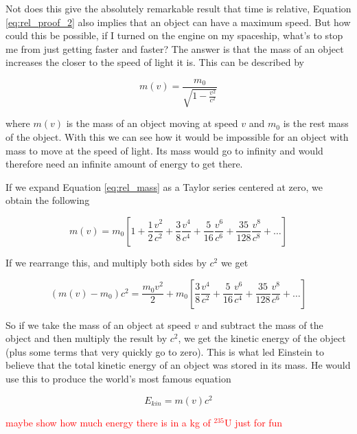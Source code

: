 \documentclass[12pt]{report}
\newcommand{\notetodylan}[1]{\textcolor{red}{#1}} %
\begin{document}
Not does this give the absolutely remarkable result that time is relative, Equation \ref{eq:rel_proof_2} also implies that an object can have a maximum speed. But how could this be possible, if I turned on the engine on my spaceship, what's to stop me from just getting faster and faster? The answer is that the mass of an object increases the closer to the speed of light it is. This can be described by
 
\begin{equation}
\label{eq:rel_mass}
m(v) = \frac{m_{0}}{\sqrt{1 - \frac{v^{2}}{c^{2}}}}
\end{equation}

where $m(v)$ is the mass of an object moving at speed $v$ and $m_{0}$ is the rest mass of the object. With this we can see how it would be impossible for an object with mass to move at the speed of light. Its mass would go to infinity and would therefore need an infinite amount of energy to get there.

If we expand Equation \ref{eq:rel_mass} as a Taylor series centered at zero, we obtain the following 

\begin{equation}
\label{eq:rel_mass_taylor}
m(v) = m_{0}\left[1 + \frac{1}{2}\frac{v^{2}}{c^{2}} + \frac{3}{8}\frac{v^{4}}{c^{4}} + \frac{5}{16}\frac{v^{6}}{c^{6}} + \frac{35}{128}\frac{v^{8}}{c^{8}} + \ldots\right]
\end{equation}

If we rearrange this, and multiply both sides by $c^{2}$ we get

\begin{equation}
\label{eq:rel_mass_taylor_rea}
(m(v) -  m_{0})c^{2}= \frac{m_{0}v^{2}}{2} + m_{0}\left[\frac{3}{8}\frac{v^{4}}{c^{2}} + \frac{5}{16}\frac{v^{6}}{c^{4}} + \frac{35}{128}\frac{v^{8}}{c^{6}} + \ldots\right]
\end{equation}

So if we take the mass of an object at speed $v$ and subtract the mass of the object and then multiply the result by $c^{2}$, we get the kinetic energy of the object (plus some terms that very quickly go to zero). This is what led Einstein to believe that the total kinetic energy of an object was stored in its mass. He would use this to produce the world's most famous equation

\begin{equation}
\label{eq:emc2}
E_{kin} = m(v)c^{2}
\end{equation}

\notetodylan{maybe show how much energy there is in a kg of $^{235}$U just for fun}
\end{document}
